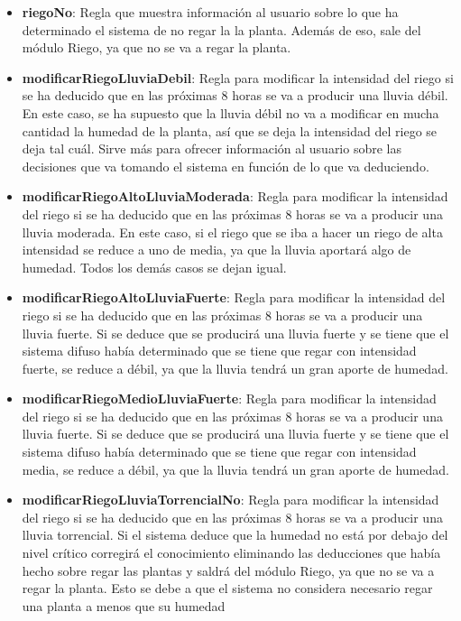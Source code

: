 \documentclass[11pt,a4paper]{article}
\begin{document}
\begin{itemize}
	\item \textbf{riegoNo}: Regla que muestra información al usuario sobre lo que ha determinado el sistema de no regar la
	la planta. Además de eso, sale del módulo Riego, ya que no se va a regar la planta.
	\item \textbf{modificarRiegoLluviaDebil}: Regla para modificar la intensidad del riego si se ha deducido que en las próximas
	8 horas se va a producir una lluvia débil. En este caso, se ha supuesto que la lluvia débil no va a modificar en mucha cantidad
	la humedad de la planta, así que se deja la intensidad del riego se deja tal cuál. Sirve más para ofrecer información al usuario
	sobre las decisiones que va tomando el sistema en función de lo que va deduciendo.
	\item \textbf{modificarRiegoAltoLluviaModerada}: Regla para modificar la intensidad del riego si se ha deducido que en las
	próximas 8 horas se va a producir una lluvia moderada. En este caso, si el riego que se iba a hacer un riego de alta intensidad
	se reduce a uno de media, ya que la lluvia aportará algo de humedad. Todos los demás casos se dejan igual.
	\item \textbf{modificarRiegoAltoLluviaFuerte}: Regla para modificar la intensidad del riego si se ha deducido que en las próximas
	8 horas se va a producir una lluvia fuerte. Si se deduce que se producirá una lluvia fuerte y se tiene que el sistema difuso
	había determinado que se tiene que regar con intensidad fuerte, se reduce a débil, ya que la lluvia tendrá un gran aporte de
	humedad.
	\item \textbf{modificarRiegoMedioLluviaFuerte}: Regla para modificar la intensidad del riego si se ha deducido que en las
	próximas 8 horas se va a producir una lluvia fuerte. Si se deduce que se producirá una lluvia fuerte y se tiene que el sistema
	difuso había determinado que se tiene que regar con intensidad media, se reduce a débil, ya que la lluvia tendrá un gran aporte
	de humedad.
	\item \textbf{modificarRiegoLluviaTorrencialNo}: Regla para modificar la intensidad del riego si se ha deducido que en las
	próximas 8 horas se va a producir una lluvia torrencial. Si el sistema deduce que la humedad no está por debajo del nivel
	crítico corregirá el conocimiento eliminando las deducciones que había hecho sobre regar las plantas y saldrá del módulo Riego,
	ya que no se va a regar la planta. Esto se debe a que el sistema no considera necesario regar una planta a menos que su humedad

\end{itemize}
\end{document}

